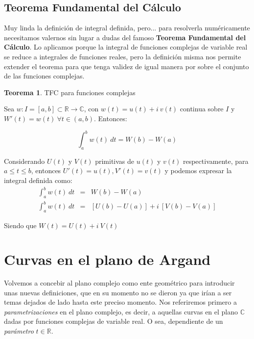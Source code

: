 \documentclass[12pt]{article}
\theoremstyle{definition}
\theoremstyle{theorem}
\newtheorem{theorem}{Teorema}[section]
\theoremstyle{corolary}
\begin{document}
\subsection{Teorema Fundamental del C\'alculo}
Muy linda la definici\'on de integral definida, pero... para resolverla num\'ericamente necesitamos valernos sin lugar a dudas del famoso \textbf{Teorema Fundamental del C\'alculo}. Lo aplicamos porque la integral de funciones complejas de variable real se reduce a integrales de funciones reales, pero la definici\'on misma nos permite extender el teorema para que tenga validez de igual manera por sobre el conjunto de las funciones complejas.\\

\colorbox{magenta!40!white!80}{\parbox{\linewidth}{
\theoremstyle{theorem}
\begin{theorem} {TFC para funciones complejas}

Sea $w:I = [a,b]\subset \mathbb{R}\rightarrow \mathbb{C}$, con $w(t) = u(t) + i\ v(t)$ continua sobre $I$ y $W'(t) = w(t)\ \forall t\in (a, b)$. Entonces:

$$\int_a^b w(t)\ dt = W(b) - W(a) $$

\end{theorem}}}
\linebreak
\linebreak

Considerando $U(t)$ y $V(t)$ primitivas de $u(t)$ y $v(t)$ respectivamente, para $a\leq t \leq b$, entonces $U'(t) = u(t), V'(t) = v(t)$ y podemos expresar la integral definida como:
\begin{eqnarray*}
\int_a^b w(t)\ dt &=& W(b) - W(a)\\
\int_a^b w(t)\ dt &=& [U(b)-U(a)] + i\ [V(b)-V(a)]
\end{eqnarray*}

Siendo que $W(t) = U(t)+i\ V(t)$

\section{Curvas en el plano de Argand}
Volvemos a concebir al plano complejo como ente geom\'etrico para introducir unas nuevas definiciones, que en su momento no se dieron ya que ir\'ian a ser temas dejados de lado hasta este preciso momento. Nos referiremos primero a \textit{parametrizaciones} en el plano complejo, es decir, a aquellas curvas en el plano $\mathbb{C}$ dadas por funciones complejas de variable real. O sea, dependiente de un \textit{par\'ametro} $t \in \mathbb{R}$.
\end{document}
